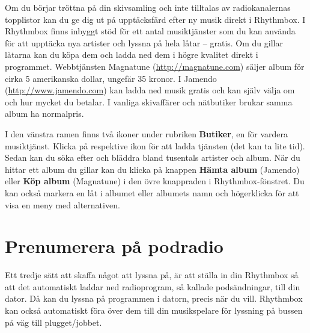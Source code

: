 \documentclass[a4paper,final]{memoir} %
\begin{document}

Om du börjar tröttna på din skivsamling och inte tilltalas av radiokanalernas topplistor kan du ge dig ut på upptäcksfärd efter ny musik direkt i Rhythmbox. I Rhythmbox finns inbyggt stöd för ett antal musiktjänster som du kan använda för att upptäcka nya artister och lyssna på hela låtar -- gratis. Om du gillar låtarna kan du köpa dem och ladda ned dem i högre kvalitet direkt i programmet. Webbtjänsten Magnatune (\url{http://magnatune.com}) säljer album för cirka 5 amerikanska dollar, ungefär 35 kronor. I Jamendo (\url{http://www.jamendo.com}) kan ladda ned musik gratis och kan själv välja om och hur mycket du betalar. I vanliga skivaffärer och nätbutiker brukar samma album ha normalpris.



I den vänstra ramen finns två ikoner under rubriken \textbf{Butiker}, en för vardera musiktjänst. Klicka på respektive ikon för att ladda tjänsten (det kan ta lite tid). Sedan kan du söka efter och bläddra bland tusentals artister och album. När du hittar ett album du gillar kan du klicka på knappen \textbf{Hämta album} (Jamendo) eller \textbf{Köp album} (Magnatune) i den övre knappraden i Rhythmbox-fönstret. Du kan också markera en låt i albumet eller albumets namn och högerklicka för att visa en meny med alternativen.



\section{Prenumerera på podradio}


Ett tredje sätt att skaffa något att lyssna på, är att ställa in din Rhythmbox så att det automatiskt laddar ned radioprogram, så kallade podsändningar, till din dator. Då kan du lyssna på programmen i datorn, precis när du vill. Rhythmbox kan också automatiskt föra över dem till din musikspelare för lyssning på bussen på väg till plugget/jobbet.  
\end{document}
